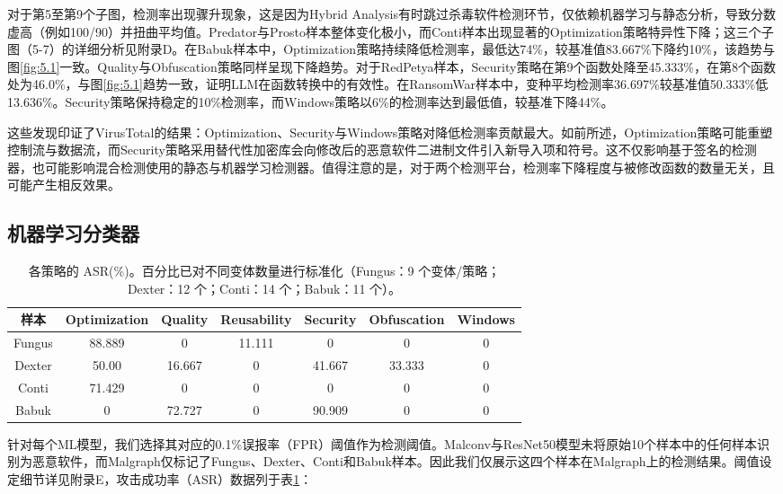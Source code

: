 对于第5至第9个子图，检测率出现骤升现象，这是因为Hybrid Analysis有时跳过杀毒软件检测环节，仅依赖机器学习与静态分析，导致分数虚高（例如100/90）并扭曲平均值。Predator与Prosto样本整体变化极小，而Conti样本出现显著的Optimization策略特异性下降；这三个子图（5-7）的详细分析见附录D。在Babuk样本中，Optimization策略持续降低检测率，最低达74\%，较基准值83.667\%下降约10\%，该趋势与图\ref{fig:5.1}一致。Quality与Obfuscation策略同样呈现下降趋势。对于RedPetya样本，Security策略在第9个函数处降至45.333\%，在第8个函数处为46.0\%，与图\ref{fig:5.1}趋势一致，证明LLM在函数转换中的有效性。在RansomWar样本中，变种平均检测率36.697\%较基准值50.333\%低13.636\%。Security策略保持稳定的10\%检测率，而Windows策略以6\%的检测率达到最低值，较基准下降44\%。

这些发现印证了VirusTotal的结果：Optimization、Security与Windows策略对降低检测率贡献最大。如前所述，Optimization策略可能重塑控制流与数据流，而Security策略采用替代性加密库会向修改后的恶意软件二进制文件引入新导入项和符号。这不仅影响基于签名的检测器，也可能影响混合检测使用的静态与机器学习检测器。值得注意的是，对于两个检测平台，检测率下降程度与被修改函数的数量无关，且可能产生相反效果。

\subsection{机器学习分类器}
\begin{table}[htbp]
	\centering
	\caption{各策略的 ASR(\%)。百分比已对不同变体数量进行标准化（Fungus：9 个变体/策略；Dexter：12 个；Conti：14 个；Babuk：11 个）。}
	\label{tab:5.1}
	\begin{tabular*}{\textwidth}{@{\extracolsep{\fill}}ccccccc}
		\toprule
		样本 & Optimization & Quality & Reusability & Security & Obfuscation & Windows \\
		\midrule
		Fungus & 88.889 & 0 & 11.111 & 0 & 0 & 0 \\
		Dexter & 50.00 & 16.667 & 0 & 41.667 & 33.333 & 0 \\
		Conti & 71.429 & 0 & 0 & 0 & 0 & 0 \\
		Babuk & 0 & 72.727 & 0 & 90.909 & 0 & 0 \\
		\bottomrule
	\end{tabular*}
\end{table}

针对每个ML模型，我们选择其对应的0.1\%误报率（FPR）阈值作为检测阈值。Malconv与ResNet50模型未将原始10个样本中的任何样本识别为恶意软件，而Malgraph仅标记了Fungus、Dexter、Conti和Babuk样本。因此我们仅展示这四个样本在Malgraph上的检测结果。阈值设定细节详见附录E，攻击成功率（ASR）数据列于表\ref{tab:5.1}：

